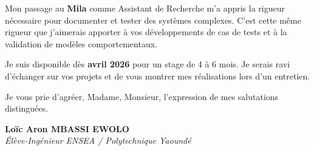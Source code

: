 \documentclass[a4paper,11pt]{article}
\begin{document}
Mon passage au \textbf{Mila} comme Assistant de Recherche m'a appris la rigueur nécessaire pour documenter et tester des systèmes complexes. C'est cette même rigueur que j'aimerais apporter à vos développements de cas de tests et à la validation de modèles comportementaux.

Je suis disponible dès \textbf{avril 2026} pour un stage de 4 à 6 mois. Je serais ravi d'échanger sur vos projets et de vous montrer mes réalisations lors d'un entretien.

Je vous prie d'agréer, Madame, Monsieur, l'expression de mes salutations distinguées.

\vspace{1cm}

\textbf{Loïc Aron MBASSI EWOLO}\\
\textit{Élève-Ingénieur ENSEA / Polytechnique Yaoundé}
\end{document}
